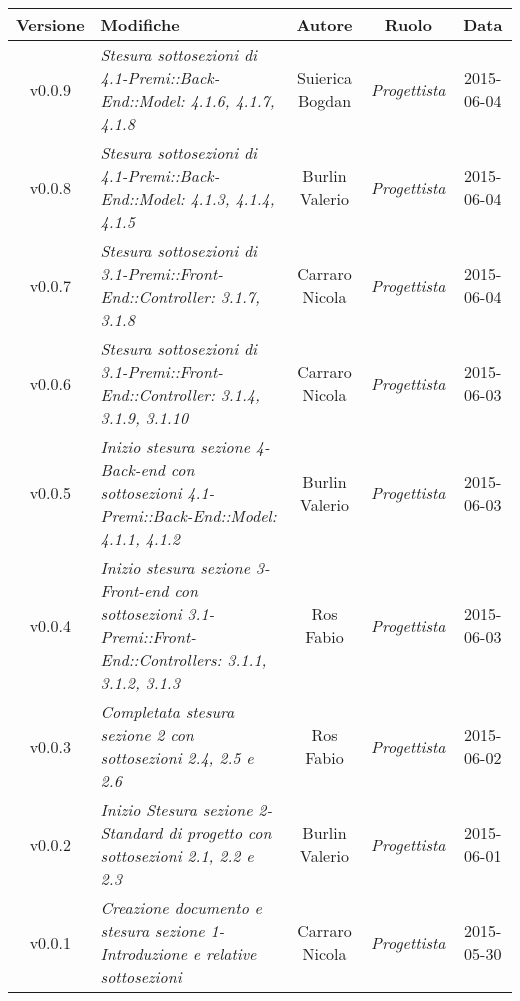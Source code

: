 \begin{table}[h]
	\centering
	\begin{tabular}{|c|p{}|c|c|c|}
		\toprule
			\textbf{Versione} & \textbf{Modifiche} & \textbf{Autore} & \textbf{Ruolo} & \textbf{Data}\\
		\midrule
		\midrule
			v0.0.9 & \textit{Stesura sottosezioni di 4.1-Premi::Back-End::Model: 4.1.6, 4.1.7, 4.1.8} & Suierica Bogdan & \textit{Progettista} & 2015-06-04\\
		\midrule
			v0.0.8 & \textit{Stesura sottosezioni di 4.1-Premi::Back-End::Model: 4.1.3, 4.1.4, 4.1.5} & Burlin Valerio & \textit{Progettista} & 2015-06-04\\
		\midrule
			v0.0.7 & \textit{Stesura sottosezioni di 3.1-Premi::Front-End::Controller: 3.1.7, 3.1.8} & Carraro Nicola & \textit{Progettista} & 2015-06-04\\
		\midrule
			v0.0.6 & \textit{Stesura sottosezioni di 3.1-Premi::Front-End::Controller: 3.1.4, 3.1.9, 3.1.10} & Carraro Nicola & \textit{Progettista} & 2015-06-03\\
		\midrule
			v0.0.5 & \textit{Inizio stesura sezione 4-Back-end con sottosezioni 4.1-Premi::Back-End::Model: 4.1.1, 4.1.2} & Burlin Valerio & \textit{Progettista} & 2015-06-03\\
		\midrule
			v0.0.4 & \textit{Inizio stesura sezione 3-Front-end con sottosezioni 3.1-Premi::Front-End::Controllers: 3.1.1, 3.1.2, 3.1.3} & Ros Fabio & \textit{Progettista} & 2015-06-03\\
		\midrule
			v0.0.3 & \textit{Completata stesura sezione 2 con sottosezioni 2.4, 2.5 e 2.6} & Ros Fabio & \textit{Progettista} & 2015-06-02\\
		\midrule
			v0.0.2 & \textit{Inizio Stesura sezione 2-Standard di progetto con sottosezioni 2.1, 2.2 e 2.3} & Burlin Valerio & \textit{Progettista} & 2015-06-01\\
		\midrule
			v0.0.1 & \textit{Creazione documento e stesura sezione 1-Introduzione e relative sottosezioni} & Carraro Nicola & \textit{Progettista} & 2015-05-30\\
		\bottomrule
	\end{tabular}
\end{table}

\newpage
